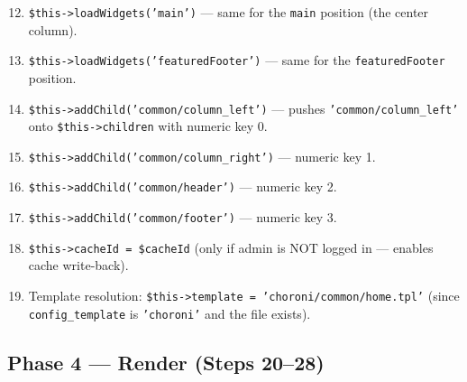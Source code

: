 \documentclass[11pt,a4paper]{article}
\begin{document}
\begin{enumerate}[leftmargin=1.6em,itemsep=2pt]
  \setcounter{enumi}{11}
  \item \texttt{\$this->loadWidgets('main')} --- same for the
        \texttt{main} position (the center column).
  \item \texttt{\$this->loadWidgets('featuredFooter')} --- same
        for the \texttt{featuredFooter} position.
  \item \texttt{\$this->addChild('common/column\_left')} ---
        pushes \texttt{'common/column\_left'} onto
        \texttt{\$this->children} with numeric key 0.
  \item \texttt{\$this->addChild('common/column\_right')} ---
        numeric key 1.
  \item \texttt{\$this->addChild('common/header')} --- numeric
        key 2.
  \item \texttt{\$this->addChild('common/footer')} --- numeric
        key 3.
  \item \texttt{\$this->cacheId = \$cacheId} (only if admin is
        NOT logged in --- enables cache write-back).
  \item Template resolution: \texttt{\$this->template =
        'choroni/common/home.tpl'} (since
        \texttt{config\_template} is \texttt{'choroni'} and the
        file exists).
\end{enumerate}

\subsection{Phase 4 --- Render (Steps 20--28)}
\end{document}
